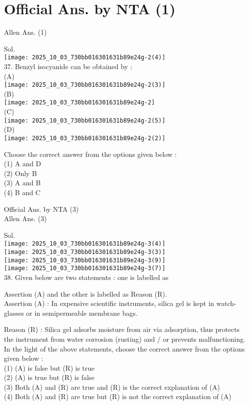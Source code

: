 \documentclass[10pt]{article}
\begin{document}
\section*{Official Ans. by NTA (1)}
Allen Ans. (1)

Sol.\\
\texttt{[image: 2025\_10\_03\_730bb016301631b89e24g-2(4)]}\\
37. Benzyl isocyanide can be obtained by :\\
(A)\\
\texttt{[image: 2025\_10\_03\_730bb016301631b89e24g-2(3)]}\\
(B)\\
\texttt{[image: 2025\_10\_03\_730bb016301631b89e24g-2]}\\
(C)\\
\texttt{[image: 2025\_10\_03\_730bb016301631b89e24g-2(5)]}\\
(D)\\
\texttt{[image: 2025\_10\_03\_730bb016301631b89e24g-2(2)]}

Choose the correct answer from the options given below :\\
(1) A and D\\
(2) Only B\\
(3) A and B\\
(4) B and C

Official Ans. by NTA (3)\\
Allen Ans. (3)

Sol.\\
\texttt{[image: 2025\_10\_03\_730bb016301631b89e24g-3(4)]}\\
\texttt{[image: 2025\_10\_03\_730bb016301631b89e24g-3(3)]}\\
\texttt{[image: 2025\_10\_03\_730bb016301631b89e24g-3(9)]}\\
\texttt{[image: 2025\_10\_03\_730bb016301631b89e24g-3(7)]}\\
38. Given below are two statements : one is labelled as

Assertion (A) and the other is labelled as Reason (R).\\
Assertion (A) : In expensive scientific instruments, silica gel is kept in watch-glasses or in semipermeable membrane bags.

Reason (R) : Silica gel adsorbs moisture from air via adsorption, thus protects the instrument from water corrosion (rusting) and / or prevents malfunctioning. In the light of the above statements, choose the correct answer from the options given below :\\
(1) (A) is false but (R) is true\\
(2) (A) is true but (R) is false\\
(3) Both (A) and (R) are true and (R) is the correct explanation of (A)\\
(4) Both (A) and (R) are true but (R) is not the correct explanation of (A)
\end{document}
